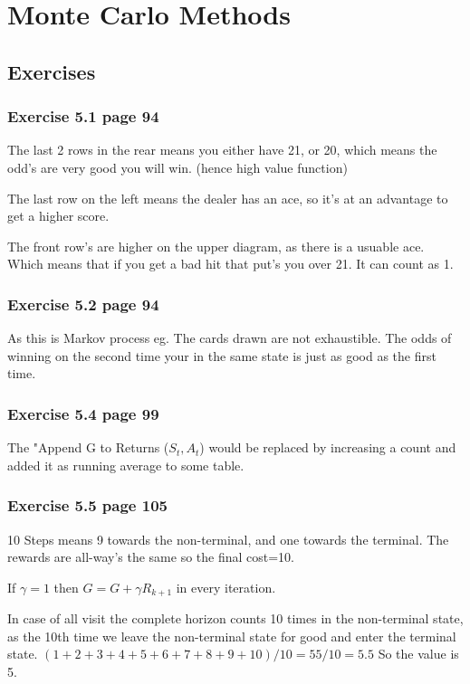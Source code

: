 \chapter{Monte Carlo Methods}

\section{Exercises}

\subsection{Exercise 5.1 page 94}
The last 2 rows in the rear means you either have 21, or 20, which means the odd's are very good you will win. (hence high value function)

The last row on the left means the dealer has an ace, so it's at an advantage to get a higher score.

The front row's are higher on the upper diagram, as there is a usuable ace. Which means that if you get a bad hit that put's you over 21. It can count as 1.

\subsection{Exercise 5.2 page 94}
As this is Markov process eg. The cards drawn are not exhaustible. The odds of winning on the second time your in the same state is just as good as the first time.

\subsection{Exercise 5.4 page 99}
The "Append G to Returns ($S_{t} , A_{t}$) would be replaced by increasing a count and added it as running average to some table.

\subsection{Exercise 5.5 page 105}
10 Steps means 9 towards the non-terminal, and one towards the terminal. The rewards are all-way's the same so the final cost=10. 

If $\gamma = 1$ then $G=G+\gamma R_{k+1}$ in every iteration. 

In case of all visit the complete horizon counts 10 times in the non-terminal state, as the 10th time we leave the non-terminal state for good and enter the terminal state. $(1+2+3+4+5+6+7+8+9+10)/10 = 55/10 = 5.5$ So the value is 5.

